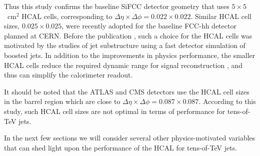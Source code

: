 Thus this study confirms the  baseline SiFCC detector geometry \cite{Chekanov:2016ppq}
that uses $5\times 5$~cm$^2$ HCAL cells,
corresponding to $\Delta \eta \times \Delta \phi = 0.022\times0.022$.
Similar HCAL cell sizes,  $0.025\times0.025$, 
were recently adopted for the baseline FCC-hh detector \cite{fcc1,fcc2} planned at CERN.
Before the publication \cite{Chekanov:2016ppq},   such a choice for the HCAL cells   
was motivated by the studies of jet substructure  using a fast detector simulation of boosted jets.
In addition to the improvements in physics performance, the smaller HCAL cells 
reduce the required dynamic range for 
signal reconstruction \cite{Chekanov:2015ihl}, and thus can simplify the calorimeter readout.

It should be noted that the ATLAS and CMS detectors use the HCAL cell sizes in the barrel region which are close to 
$\Delta \eta \times \Delta \phi = 0.087\times 0.087$.  According to this study,
such HCAL cell sizes are not optimal in terms of performance  for tens-of-TeV jets.

In the next few sections we will consider several other physics-motivated
variables that can shed light  upon the performance of the HCAL for tens-of-TeV jets.


